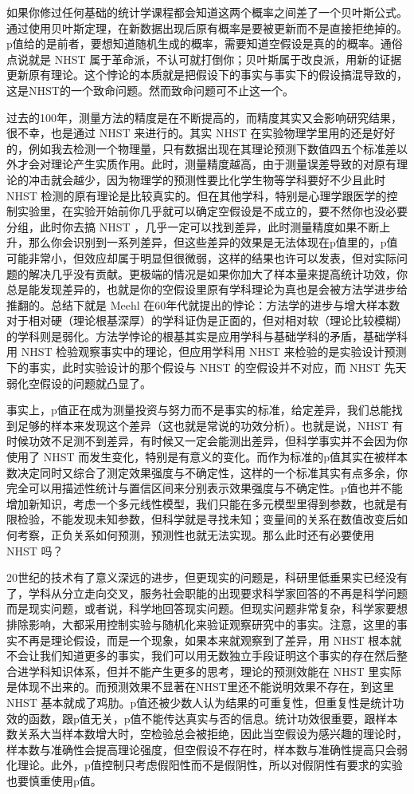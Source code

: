 \documentclass[
]{book}
\begin{document}
如果你修过任何基础的统计学课程都会知道这两个概率之间差了一个贝叶斯公式。通过使用贝叶斯定理，在新数据出现后原有概率是要被更新而不是直接拒绝掉的。p值给的是前者，要想知道随机生成的概率，需要知道空假设是真的的概率。通俗点说就是 NHST 属于革命派，不认可就打倒你；贝叶斯属于改良派，用新的证据更新原有理论。这个悖论的本质就是把假设下的事实与事实下的假设搞混导致的，这是NHST的一个致命问题。然而致命问题可不止这一个。

过去的100年，测量方法的精度是在不断提高的，而精度其实又会影响研究结果，很不幸，也是通过 NHST 来进行的。其实 NHST 在实验物理学里用的还是好好的，例如我去检测一个物理量，只有数据出现在其理论预测下数值四五个标准差以外才会对理论产生实质作用。此时，测量精度越高，由于测量误差导致的对原有理论的冲击就会越少，因为物理学的预测性要比化学生物等学科要好不少且此时 NHST 检测的原有理论是比较真实的。但在其他学科，特别是心理学跟医学的控制实验里，在实验开始前你几乎就可以确定空假设是不成立的，要不然你也没必要分组，此时你去搞 NHST ，几乎一定可以找到差异，此时测量精度如果不断上升，那么你会识别到一系列差异，但这些差异的效果是无法体现在p值里的，p值可能非常小，但效应却属于明显但很微弱，这样的结果也许可以发表，但对实际问题的解决几乎没有贡献。更极端的情况是如果你加大了样本量来提高统计功效，你总是能发现差异的，也就是你的空假设里原有学科理论为真也是会被方法学进步给推翻的。总结下就是 Meehl 在60年代就提出的悖论：方法学的进步与增大样本数对于相对硬（理论根基深厚）的学科证伪是正面的，但对相对软（理论比较模糊）的学科则是弱化。方法学悖论的根基其实是应用学科与基础学科的矛盾，基础学科用 NHST 检验观察事实中的理论，但应用学科用 NHST 来检验的是实验设计预测下的事实，此时实验设计的那个假设与 NHST 的空假设并不对应，而 NHST 先天弱化空假设的问题就凸显了。

事实上，p值正在成为测量投资与努力而不是事实的标准，给定差异，我们总能找到足够的样本来发现这个差异（这也就是常说的功效分析）。也就是说，NHST 有时候功效不足测不到差异，有时候又一定会能测出差异，但科学事实并不会因为你使用了 NHST 而发生变化，特别是有意义的变化。而作为标准的p值其实在被样本数决定同时又综合了测定效果强度与不确定性，这样的一个标准其实有点多余，你完全可以用描述性统计与置信区间来分别表示效果强度与不确定性。p值也并不能增加新知识，考虑一个多元线性模型，我们只能在多元模型里得到参数，也就是有限检验，不能发现未知参数，但科学就是寻找未知；变量间的关系在数值改变后如何考察，正负关系如何预测，预测性也就无法实现。那么此时还有必要使用 NHST 吗？

20世纪的技术有了意义深远的进步，但更现实的问题是，科研里低垂果实已经没有了，学科从分立走向交叉，服务社会职能的出现要求科学家回答的不再是科学问题而是现实问题，或者说，科学地回答现实问题。但现实问题非常复杂，科学家要想排除影响，大都采用控制实验与随机化来验证观察研究中的事实。注意，这里的事实不再是理论假设，而是一个现象，如果本来就观察到了差异，用 NHST 根本就不会让我们知道更多的事实，我们可以用无数独立手段证明这个事实的存在然后整合进学科知识体系，但并不能产生更多的思考，理论的预测效能在 NHST 里实际是体现不出来的。而预测效果不显著在NHST里还不能说明效果不存在，到这里 NHST 基本就成了鸡肋。p值还被少数人认为结果的可重复性，但重复性是统计功效的函数，跟p值无关，p值不能传达真实与否的信息。统计功效很重要，跟样本数关系大当样本数增大时，空检验总会被拒绝，因此当空假设为感兴趣的理论时，样本数与准确性会提高理论强度，但空假设不存在时，样本数与准确性提高只会弱化理论。此外，p值控制只考虑假阳性而不是假阴性，所以对假阴性有要求的实验也要慎重使用p值。
\end{document}
